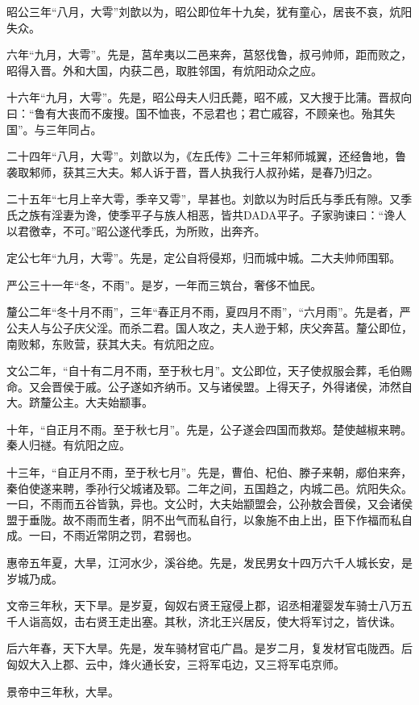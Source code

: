 \documentclass[]{article}
\begin{document}
昭公三年``八月，大雩''刘歆以为，昭公即位年十九矣，犹有童心，居丧不哀，炕阳失众。

六年``九月，大雩''。先是，莒牟夷以二邑来奔，莒怒伐鲁，叔弓帅师，距而败之，昭得入晋。外和大国，内获二邑，取胜邻国，有炕阳动众之应。

十六年``九月，大雩''。先是，昭公母夫人归氏薨，昭不戚，又大搜于比蒲。晋叔向曰：``鲁有大丧而不废搜。国不恤丧，不忌君也；君亡戚容，不顾亲也。殆其失国''。与三年同占。

二十四年``八月，大雩''。刘歆以为，《左氏传》二十三年邾师城翼，还经鲁地，鲁袭取邾师，获其三大夫。邾人诉于晋，晋人执我行人叔孙婼，是春乃归之。

二十五年``七月上辛大雩，季辛又雩''，旱甚也。刘歆以为时后氏与季氏有隙。又季氏之族有淫妻为谗，使季平子与族人相恶，皆共DADA平子。子家驹谏曰：``谗人以君徼幸，不可。''昭公遂代季氏，为所败，出奔齐。

定公七年``九月，大雩''。先是，定公自将侵郑，归而城中城。二大夫帅师围郓。

严公三十一年``冬，不雨''。是岁，一年而三筑台，奢侈不恤民。

釐公二年``冬十月不雨''，三年``春正月不雨，夏四月不雨''，``六月雨''。先是者，严公夫人与公子庆父淫。而杀二君。国人攻之，夫人逊于邾，庆父奔莒。釐公即位，南败邾，东败营，获其大夫。有炕阳之应。

文公二年，``自十有二月不雨，至于秋七月''。文公即位，天子使叔服会葬，毛伯赐命。又会晋侯于戚。公子遂如齐纳币。又与诸侯盟。上得天子，外得诸侯，沛然自大。跻釐公主。大夫始颛事。

十年，``自正月不雨。至于秋七月''。先是，公子遂会四国而救郑。楚使越椒来聘。秦人归禭。有炕阳之应。

十三年，``自正月不雨，至于秋七月''。先是，曹伯、杞伯、滕子来朝，郕伯来奔，秦伯使遂来聘，季孙行父城诸及郓。二年之间，五国趋之，内城二邑。炕阳失众。一曰，不雨而五谷皆孰，异也。文公时，大夫始颛盟会，公孙敖会晋侯，又会诸侯盟于垂陇。故不雨而生者，阴不出气而私自行，以象施不由上出，臣下作福而私自成。一曰，不雨近常阴之罚，君弱也。

惠帝五年夏，大旱，江河水少，溪谷绝。先是，发民男女十四万六千人城长安，是岁城乃成。

文帝三年秋，天下旱。是岁夏，匈奴右贤王寇侵上郡，诏丞相灌婴发车骑士八万五千人诣高奴，击右贤王走出塞。其秋，济北王兴居反，使大将军讨之，皆伏诛。

后六年春，天下大旱。先是，发车骑材官屯广昌。是岁二月，复发材官屯陇西。后匈奴大入上郡、云中，烽火通长安，三将军屯边，又三将军屯京师。

景帝中三年秋，大旱。
\end{document}
